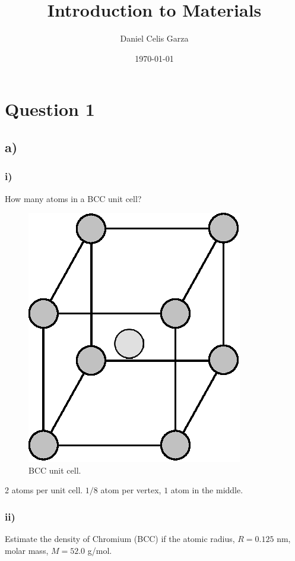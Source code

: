 \documentclass[a4paper]{article}
\title{Introduction to Materials}
\author{Daniel Celis Garza}
\date{\today}
\begin{document}
\maketitle
	\section{Question 1}
	\subsection{a)}
	\subsubsection{i)}
		How many atoms in a BCC unit cell?
		
		\begin{figure}
			\centering
			\includegraphics[width=0.33\linewidth]{bcc.eps}
			\caption{BCC unit cell.}
			\label{f:bcc}
		\end{figure}
		2 atoms per unit cell. $1/8$ atom per vertex, $1$ atom in the middle.
		
	\subsubsection{ii)}
		Estimate the density of Chromium (BCC) if the atomic radius, $R = 0.125$ nm, molar mass, $M = 52.0$ g/mol.
		
\end{document}
